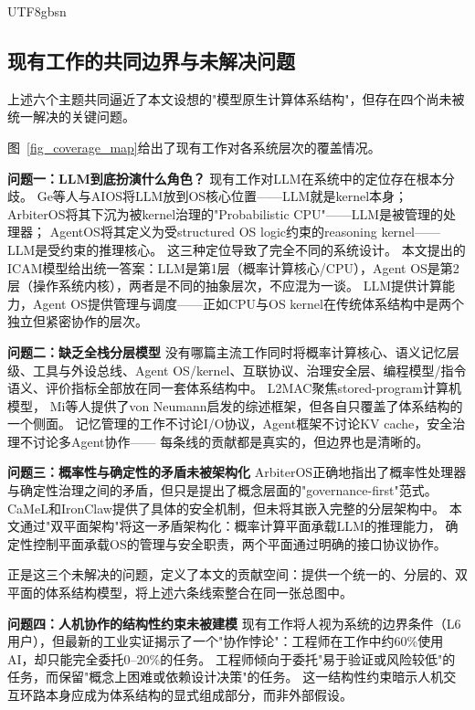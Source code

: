 \documentclass[11pt,a4paper]{article}
\begin{document}
\begin{CJK*}{UTF8}{gbsn}
\subsection{现有工作的共同边界与未解决问题}
\label{sec:related-gap}

上述六个主题共同逼近了本文设想的"模型原生计算体系结构"，但存在四个尚未被统一解决的关键问题。

图~\ref{fig_coverage_map}给出了现有工作对各系统层次的覆盖情况。


\textbf{问题一：LLM到底扮演什么角色？}
现有工作对LLM在系统中的定位存在根本分歧。
Ge等人与AIOS将LLM放到OS核心位置\cite{ge2023llmos,mei2024aios}——LLM就是kernel本身；
ArbiterOS将其下沉为被kernel治理的"Probabilistic CPU"\cite{arbiteros2025}——LLM是被管理的处理器；
AgentOS将其定义为受structured OS logic约束的reasoning kernel\cite{agentos2025}——LLM是受约束的推理核心。
这三种定位导致了完全不同的系统设计。
本文提出的ICAM模型给出统一答案：LLM是第1层（概率计算核心/CPU），Agent OS是第2层（操作系统内核），两者是不同的抽象层次，不应混为一谈。
LLM提供计算能力，Agent OS提供管理与调度——正如CPU与OS kernel在传统体系结构中是两个独立但紧密协作的层次。

\textbf{问题二：缺乏全栈分层模型}
没有哪篇主流工作同时将概率计算核心、语义记忆层级、工具与外设总线、Agent OS/kernel、互联协议、治理安全层、编程模型/指令语义、评价指标全部放在同一套体系结构中。
L2MAC\cite{holt2024l2mac}聚焦stored-program计算机模型，
Mi等人\cite{mi2025llmagentscomputersystems}提供了von Neumann启发的综述框架，但各自只覆盖了体系结构的一个侧面。
记忆管理的工作不讨论I/O协议，Agent框架不讨论KV cache，安全治理不讨论多Agent协作——%
每条线的贡献都是真实的，但边界也是清晰的。

\textbf{问题三：概率性与确定性的矛盾未被架构化}
ArbiterOS\cite{arbiteros2025}正确地指出了概率性处理器与确定性治理之间的矛盾，但只是提出了概念层面的"governance-first"范式。
CaMeL\cite{debenedetti2025camel}和IronClaw\cite{ironclaw2025}提供了具体的安全机制，但未将其嵌入完整的分层架构中。
本文通过"双平面架构"将这一矛盾架构化：概率计算平面承载LLM的推理能力，
确定性控制平面承载OS的管理与安全职责，两个平面通过明确的接口协议协作。

正是这三个未解决的问题，定义了本文的贡献空间：提供一个统一的、分层的、双平面的体系结构模型，将上述六条线索整合在同一张总图中。

\textbf{问题四：人机协作的结构性约束未被建模}
现有工作将人视为系统的边界条件（L6用户），但最新的工业实证揭示了一个"协作悖论"：工程师在工作中约60\%使用AI，却只能完全委托0--20\%的任务\cite{anthropic2026agenticreport}。
工程师倾向于委托"易于验证或风险较低"的任务，而保留"概念上困难或依赖设计决策"的任务。
这一结构性约束暗示人机交互环路本身应成为体系结构的显式组成部分，而非外部假设。%

\end{CJK*}
\end{document}
